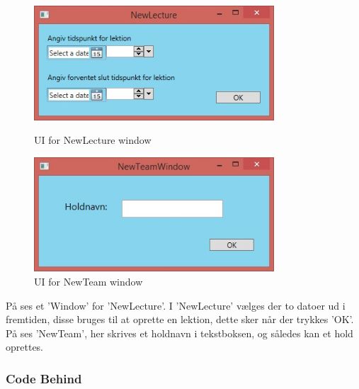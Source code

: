 \begin{figure}[htbp]
\centering
\begin{minipage}{.5\textwidth}
  \centering
  \includegraphics[width=0.8\textwidth]{images/UI/NewLecture.jpg}
  \caption[UINewLecture]{UI for NewLecture window}
  \label{fig:NewLecture}
\end{minipage}%
\begin{minipage}{.5\textwidth}
  \centering
  \includegraphics[width=0.8\textwidth]{images/UI/NewTeam.jpg}
  \caption[UINewTeam]{UI for NewTeam window}
  \label{fig:NewTeam}
\end{minipage}%
\end{figure}

På  ses et 'Window' for 'NewLecture'. 
I 'NewLecture' vælges der to datoer ud i fremtiden, disse bruges til at oprette en lektion, dette sker når der trykkes 'OK'. 
På  ses 'NewTeam', her skrives et holdnavn i tekstboksen, og således kan et hold oprettes.

\subsubsection{Code Behind}
